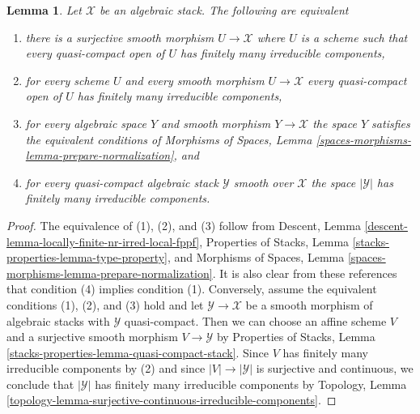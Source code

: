 \documentclass[10pt,a4paper]{amsart}
\theoremstyle{plain}
\newtheorem{lemma}[subsection]{Lemma}
\theoremstyle{definition}
\theoremstyle{remark}
\numberwithin{equation}{subsection}
\begin{document}
\begin{lemma}
\label{lemma-prepare-normalization}
Let $\mathcal{X}$ be an algebraic stack. The following are equivalent
\begin{enumerate}
\item there is a surjective smooth morphism $U \to \mathcal{X}$ where $U$
is a scheme such that every quasi-compact open of $U$ has
finitely many irreducible components,
\item for every scheme $U$ and every smooth morphism
$U \to \mathcal{X}$ every quasi-compact open of $U$ has finitely many
irreducible components,
\item for every algebraic space $Y$ and smooth morphism $Y \to \mathcal{X}$
the space $Y$ satisfies the equivalent conditions of
Morphisms of Spaces, Lemma \ref{spaces-morphisms-lemma-prepare-normalization},
and
\item for every quasi-compact algebraic stack $\mathcal{Y}$ smooth over
$\mathcal{X}$ the space $|\mathcal{Y}|$ has finitely many irreducible
components.
\end{enumerate}
\end{lemma}

\begin{proof}
The equivalence of (1), (2), and (3) follow from
Descent, Lemma \ref{descent-lemma-locally-finite-nr-irred-local-fppf},
Properties of Stacks, Lemma \ref{stacks-properties-lemma-type-property}, and
Morphisms of Spaces, Lemma \ref{spaces-morphisms-lemma-prepare-normalization}.
It is also clear from these references that condition (4)
implies condition (1). Conversely, assume the equivalent conditions
(1), (2), and (3) hold and let $\mathcal{Y} \to \mathcal{X}$ be a
smooth morphism of algebraic stacks with $\mathcal{Y}$
quasi-compact. Then we can choose an affine scheme $V$ and a surjective
smooth morphism $V \to \mathcal{Y}$ by Properties of Stacks, Lemma
\ref{stacks-properties-lemma-quasi-compact-stack}.
Since $V$ has finitely many irreducible components by (2) and since
$|V| \to |\mathcal{Y}|$ is surjective and continuous, we conclude that
$|\mathcal{Y}|$ has finitely many irreducible components by Topology, Lemma
\ref{topology-lemma-surjective-continuous-irreducible-components}.
\end{proof}
\end{document}
